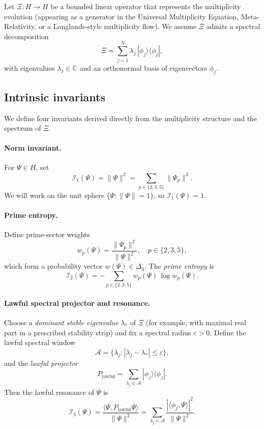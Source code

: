 \documentclass[11pt]{article}
\begin{document}
Let $\Xi : H \to H$ be a bounded linear operator that represents the multiplicity evolution
(appearing as a generator in the Universal Multiplicity Equation, Meta-Relativity, or
a Langlands-style multiplicity flow). We assume $\Xi$ admits a spectral decomposition
\begin{equation}
  \Xi = \sum_{j=1}^{N} \lambda_j\,|\phi_j\rangle\langle\phi_j|, 
  \label{eq:Xi-spectral}
\end{equation}
with eigenvalues $\lambda_j\in\mathbb{C}$ and an orthonormal basis of eigenvectors $\phi_j$.

\subsection{Intrinsic invariants}

We define four invariants derived directly from the multiplicity structure and the spectrum of $\Xi$.

\paragraph{Norm invariant.}
For $\Psi\in H$, set
\[
  \mathcal{I}_1(\Psi) = \|\Psi\|^2 = \sum_{p\in\{2,3,5\}} \|\Psi_p\|^2.
\]
We will work on the unit sphere $\{\Psi:\|\Psi\|=1\}$, so $\mathcal{I}_1(\Psi)=1$.

\paragraph{Prime entropy.}
Define prime-sector weights
\[
  w_p(\Psi) = \frac{\|\Psi_p\|^2}{\|\Psi\|^2},\quad
  p\in\{2,3,5\},
\]
which form a probability vector $w(\Psi)\in\Delta_3$. The \emph{prime entropy} is
\[
  \mathcal{I}_2(\Psi) = -\sum_{p\in\{2,3,5\}} w_p(\Psi)\,\log w_p(\Psi).
\]

\paragraph{Lawful spectral projector and resonance.}
Choose a \emph{dominant stable eigenvalue} $\lambda_*$ of $\Xi$ (for example, with maximal real part in
a prescribed stability strip) and fix a spectral radius $\varepsilon>0$. Define the lawful spectral window
\[
  \mathcal{A} = \{\lambda_j : |\lambda_j - \lambda_*| \le \varepsilon\},
\]
and the \emph{lawful projector}
\[
  P_{\mathrm{lawful}} = \sum_{\lambda_j\in\mathcal{A}} |\phi_j\rangle\langle\phi_j|.
\]
Then the lawful resonance of $\Psi$ is
\[
  \mathcal{I}_3(\Psi)
  = \frac{\langle\Psi, P_{\mathrm{lawful}}\Psi\rangle}{\|\Psi\|^2}
  = \sum_{\lambda_j\in\mathcal{A}} \frac{|\langle\phi_j,\Psi\rangle|^2}{\|\Psi\|^2}.
\]
\end{document}
